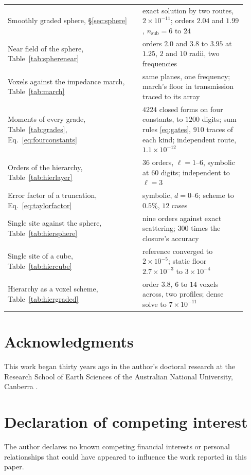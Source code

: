 \documentclass[preprint,review,12pt]{elsarticle}
\begin{document}
\begin{table}[htbp]
\begin{tabular}{@{}>{\raggedright\arraybackslash}p{0.52\linewidth}>{\raggedright\arraybackslash}p{0.40\linewidth}@{}}
Smoothly graded sphere, \S\ref{sec:sphere} & exact solution by two routes, $2\times10^{-11}$; orders $2.04$ and $1.99$, $n_{\mathrm{sub}}=6$ to $24$ \\
Near field of the sphere, Table~\ref{tab:spherenear} & orders $2.0$ and $3.8$ to $3.95$ at $1.25$, $2$ and $10$ radii, two frequencies \\
Voxels against the impedance march, Table~\ref{tab:march} & same planes, one frequency; march's floor in transmission traced to its array \\
Moments of every grade, Table~\ref{tab:grades}, Eq.~\eqref{eq:fourconstants} & $4224$ closed forms on four constants, to $1200$ digits; sum rules \eqref{eq:gates}, $910$ traces of each kind; independent route, $1.1\times10^{-12}$ \\
Orders of the hierarchy, Table~\ref{tab:hierlayer} & $36$ orders, $\ell=1$--$6$, symbolic at $60$ digits; independent to $\ell=3$ \\
Error factor of a truncation, Eq.~\eqref{eq:taylorfactor} & symbolic, $d=0$--$6$; scheme to $0.5\%$, $12$ cases \\
Single site against the sphere, Table~\ref{tab:hiersphere} & nine orders against exact scattering; $300$ times the closure's accuracy \\
Single site of a cube, Table~\ref{tab:hiercube} & reference converged to $2\times10^{-5}$; static floor $2.7\times10^{-3}$ to $3\times10^{-4}$ \\
Hierarchy as a voxel scheme, Table~\ref{tab:hiergraded} & order $3.8$, $6$ to $14$ voxels across, two profiles; dense solve to $7\times10^{-11}$ \\
\bottomrule
\end{tabular}
\end{table}

\FloatBarrier

\section*{Acknowledgments}
This work began thirty years ago in the author's doctoral research at the Research School of Earth
Sciences of the Australian National University, Canberra \citep{Nestor1996}.

\section*{Declaration of competing interest}
The author declares no known competing financial interests or personal relationships that could have
appeared to influence the work reported in this paper.
\end{document}
